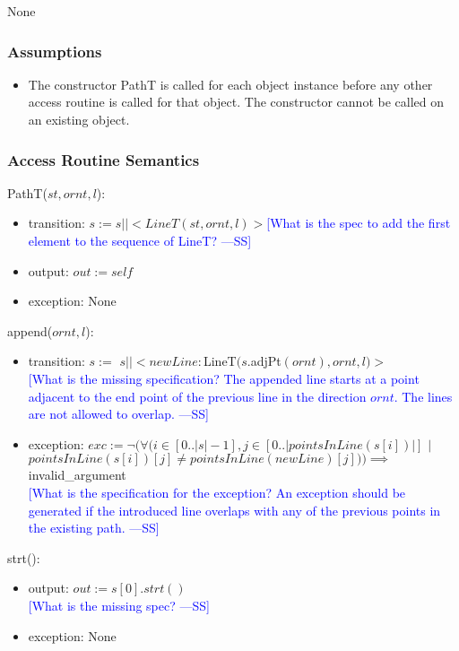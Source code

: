 \documentclass[12pt]{article}
\newcommand{\authornote}[3]{\textcolor{#1}{[#3 ---#2]}}
\newcommand{\authornote}[3]{}
\newcommand{\wss}[1]{\authornote{blue}{SS}{#1}}
\begin{document}
None

\subsubsection* {Assumptions}

\begin{itemize}
\item The constructor PathT is called for each object instance before any other
access routine is called for that object.  The constructor cannot be called on
an existing object.
\end{itemize}

\subsubsection* {Access Routine Semantics}

PathT($st, ornt, l$):
\begin{itemize}
\item transition: $s := s||<LineT(st,ornt, l)>$\wss{What is the spec to add the first element to the sequence
  of LineT?}
\item output: $out := \mathit{self}$
\item exception: None
\end{itemize}

\noindent append($ornt, l$):
\begin{itemize}
\item transition: $s :=$ $s||< newLine:$LineT$(s.$adjPt$(ornt), ornt, l)>$\\
\wss{What is the missing specification?  The appended line
    starts at a point adjacent to the end point of the previous line in the
    direction $ornt$.  The lines are not allowed to
    overlap.}
\item exception: $exc := \lnot(\forall(i\in [0..|s|-1],j \in [0..|pointsInLine(s[i])|]$ $|$ $pointsInLine(s[i])[j] \neq pointsInLine(newLine)[j])) \implies$ invalid\_argument\\
\wss{What is the specification for the exception?  An exception
    should be generated if the introduced line overlaps with any of the previous
    points in the existing path.}
\end{itemize}

\noindent strt():
\begin{itemize}
\item output: $out := s[0].strt()$\\
\wss{What is the missing spec?}
\item exception: None
\end{itemize}
\end{document}
